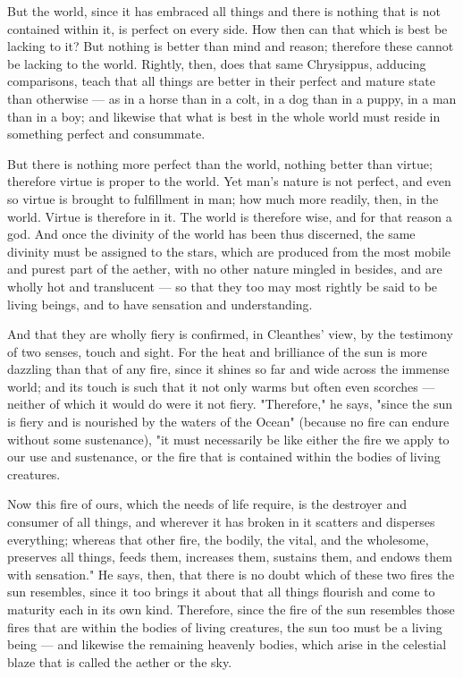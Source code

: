  But the world, since it has embraced all things and there is nothing that is not contained within it, is perfect on every side. How then can that which is best be lacking to it? But nothing is better than mind and reason; therefore these cannot be lacking to the world. Rightly, then, does that same Chrysippus, adducing comparisons, teach that all things are better in their perfect and mature state than otherwise — as in a horse than in a colt, in a dog than in a puppy, in a man than in a boy; and likewise that what is best in the whole world must reside in something perfect and consummate.

 But there is nothing more perfect than the world, nothing better than virtue; therefore virtue is proper to the world. Yet man's nature is not perfect, and even so virtue is brought to fulfillment in man; how much more readily, then, in the world. Virtue is therefore in it. The world is therefore wise, and for that reason a god. And once the divinity of the world has been thus discerned, the same divinity must be assigned to the stars, which are produced from the most mobile and purest part of the aether, with no other nature mingled in besides, and are wholly hot and translucent — so that they too may most rightly be said to be living beings, and to have sensation and understanding.

 And that they are wholly fiery is confirmed, in Cleanthes' view, by the testimony of two senses, touch and sight. For the heat and brilliance of the sun is more dazzling than that of any fire, since it shines so far and wide across the immense world; and its touch is such that it not only warms but often even scorches — neither of which it would do were it not fiery. "Therefore," he says, "since the sun is fiery and is nourished by the waters of the Ocean" (because no fire can endure without some sustenance), "it must necessarily be like either the fire we apply to our use and sustenance, or the fire that is contained within the bodies of living creatures.

 Now this fire of ours, which the needs of life require, is the destroyer and consumer of all things, and wherever it has broken in it scatters and disperses everything; whereas that other fire, the bodily, the vital, and the wholesome, preserves all things, feeds them, increases them, sustains them, and endows them with sensation." He says, then, that there is no doubt which of these two fires the sun resembles, since it too brings it about that all things flourish and come to maturity each in its own kind. Therefore, since the fire of the sun resembles those fires that are within the bodies of living creatures, the sun too must be a living being — and likewise the remaining heavenly bodies, which arise in the celestial blaze that is called the aether or the sky.

